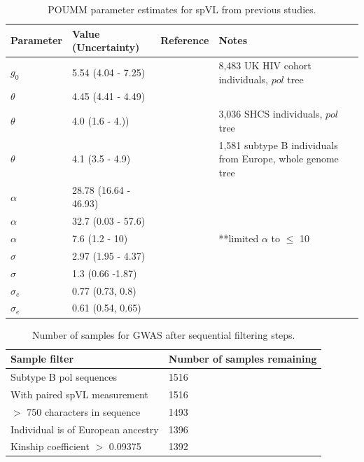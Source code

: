 \documentclass[11pt]{article}
\begin{document}
\begin{table}[H]
\caption{POUMM parameter estimates for spVL from previous studies.}
	\begin{tabularx}{\linewidth}{llXXX}
	\hline 
	Parameter & Value (Uncertainty) & Reference & Notes \\
	\hline 
	$g_0$ & 5.54 (4.04 - 7.25) & \citet{Mitov2018} & 8,483 UK HIV cohort individuals, $pol$ tree \\
	$\theta$ & 4.45 (4.41 - 4.49) & \citet{Mitov2018} & \\
	$\theta$ &  4.0 (1.6 - 4.)) & \citet{Bertels2018} & 3,036 SHCS individuals, $pol$ tree \\
	$\theta$ & 4.1 (3.5 - 4.9) & \citet{Blanquart2017} & 1,581 subtype B individuals from Europe, whole genome tree \\
	$\alpha$ & 28.78 (16.64 - 46.93) & \citet{Mitov2018} & \\
	$\alpha$ & 32.7 (0.03 - 57.6) & \citet{Bertels2018} & \\
	$\alpha$ & 7.6 (1.2 - 10) & \citet{Blanquart2017} & **limited $\alpha$ to $\le$ 10 \\
	$\sigma$ & 2.97 (1.95 - 4.37) & \citet{Mitov2018} & \\
	$\sigma$ & 1.3 (0.66 -1.87) &  \citet{Blanquart2017} & \\
	$\sigma_e$ & 0.77 (0.73, 0.8) & \citet{Mitov2018} & \\
	$\sigma_e$ & 0.61 (0.54, 0.65) &  \citet{Blanquart2017} & \\
	\hline 
	\end{tabularx}
	\label{tab:POUMMparams-prev-estimated}
\end{table}

\begin{table}[H]
\caption{Number of samples for GWAS after sequential filtering steps.}
    \begin{tabularx}{\linewidth}{XX}
    \hline
    Sample filter & Number of samples remaining \\
    \hline
    Subtype B pol sequences & 1516 \\
    With paired spVL measurement & 1516 \\
    $>$ 750 characters in sequence & 1493 \\
    Individual is of European ancestry & 1396 \\
    Kinship coefficient $>$ 0.09375 & 1392 \\ 
    \hline
    \end{tabularx}
    \label{tab:sample-filtering}
\end{table}
\end{document}
